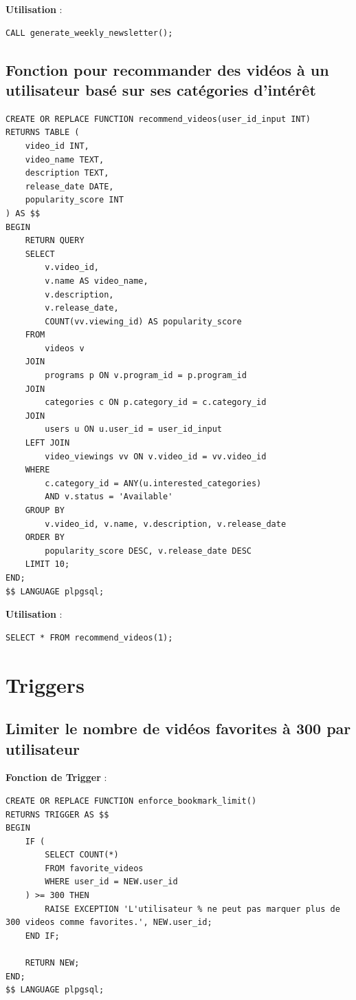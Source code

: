 \documentclass[a4paper,12pt]{article}
\begin{document}
\textbf{Utilisation} :

\begin{lstlisting}
CALL generate_weekly_newsletter();
\end{lstlisting}

\subsection{Fonction pour recommander des vidéos à un utilisateur basé sur ses catégories d'intérêt}

\begin{lstlisting}
CREATE OR REPLACE FUNCTION recommend_videos(user_id_input INT)
RETURNS TABLE (
    video_id INT,
    video_name TEXT,
    description TEXT,
    release_date DATE,
    popularity_score INT
) AS $$
BEGIN
    RETURN QUERY
    SELECT 
        v.video_id,
        v.name AS video_name,
        v.description,
        v.release_date,
        COUNT(vv.viewing_id) AS popularity_score
    FROM 
        videos v
    JOIN 
        programs p ON v.program_id = p.program_id
    JOIN 
        categories c ON p.category_id = c.category_id
    JOIN 
        users u ON u.user_id = user_id_input
    LEFT JOIN 
        video_viewings vv ON v.video_id = vv.video_id
    WHERE 
        c.category_id = ANY(u.interested_categories)
        AND v.status = 'Available'
    GROUP BY 
        v.video_id, v.name, v.description, v.release_date
    ORDER BY 
        popularity_score DESC, v.release_date DESC
    LIMIT 10;
END;
$$ LANGUAGE plpgsql;
\end{lstlisting}

\textbf{Utilisation} :

\begin{lstlisting}
SELECT * FROM recommend_videos(1);
\end{lstlisting}

\section{Triggers}

\subsection{Limiter le nombre de vidéos favorites à 300 par utilisateur}

\textbf{Fonction de Trigger} :

\begin{lstlisting}
CREATE OR REPLACE FUNCTION enforce_bookmark_limit()
RETURNS TRIGGER AS $$
BEGIN
    IF (
        SELECT COUNT(*) 
        FROM favorite_videos 
        WHERE user_id = NEW.user_id
    ) >= 300 THEN
        RAISE EXCEPTION 'L'utilisateur % ne peut pas marquer plus de 300 videos comme favorites.', NEW.user_id;
    END IF;

    RETURN NEW;
END;
$$ LANGUAGE plpgsql;
\end{lstlisting}
\end{document}
